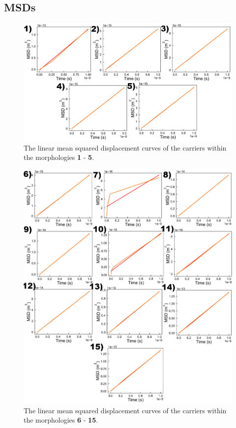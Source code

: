 \documentclass[12pt]{article}
\begin{document}
\clearpage
\subsection{MSDs}


\begin{figure}[h!]\centering
	\includegraphics[width=\textwidth]{Figures/LinMSDHole.pdf}
    \caption{The linear mean squared displacement curves of the carriers within the morphologies \textbf{1} - \textbf{5}.}
	\label{fig:MSD}
\end{figure}


\begin{figure}[h!]\centering
	\includegraphics[width=\textwidth]{Figures/LinMSDHoleFrame.png}
    \caption{The linear mean squared displacement curves of the carriers within the morphologies \textbf{6} - \textbf{15}.}
	\label{fig:MSDFrame}
\end{figure}
\end{document}
